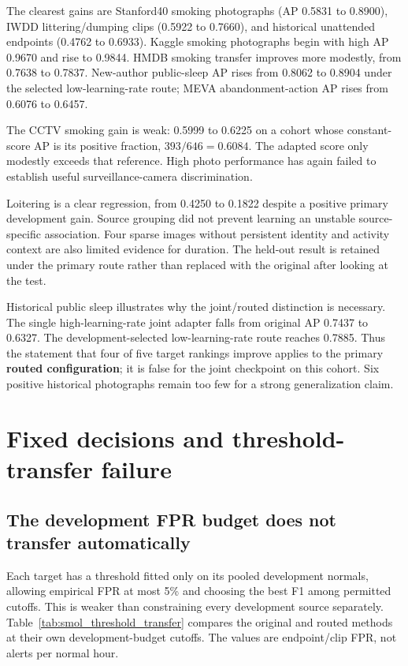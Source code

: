 The clearest gains are Stanford40 smoking photographs (AP 0.5831 to 0.8900), IWDD littering/dumping clips (0.5922 to 0.7660), and historical unattended endpoints (0.4762 to 0.6933). Kaggle smoking photographs begin with high AP 0.9670 and rise to 0.9844. HMDB smoking transfer improves more modestly, from 0.7638 to 0.7837. New-author public-sleep AP rises from 0.8062 to 0.8904 under the selected low-learning-rate route; MEVA abandonment-action AP rises from 0.6076 to 0.6457.

The CCTV smoking gain is weak: 0.5999 to 0.6225 on a cohort whose constant-score AP is its positive fraction, $393/646=0.6084$. The adapted score only modestly exceeds that reference. High photo performance has again failed to establish useful surveillance-camera discrimination.

Loitering is a clear regression, from 0.4250 to 0.1822 despite a positive primary development gain. Source grouping did not prevent learning an unstable source-specific association. Four sparse images without persistent identity and activity context are also limited evidence for duration. The held-out result is retained under the primary route rather than replaced with the original after looking at the test.

Historical public sleep illustrates why the joint/routed distinction is necessary. The single high-learning-rate joint adapter falls from original AP 0.7437 to 0.6327. The development-selected low-learning-rate route reaches 0.7885. Thus the statement that four of five target rankings improve applies to the primary \textbf{routed configuration}; it is false for the joint checkpoint on this cohort. Six positive historical photographs remain too few for a strong generalization claim.

\section{Fixed decisions and threshold-transfer failure}
\subsection{The development FPR budget does not transfer automatically}
Each target has a threshold fitted only on its pooled development normals, allowing empirical FPR at most 5\% and choosing the best F1 among permitted cutoffs. This is weaker than constraining every development source separately. Table~\ref{tab:smol_threshold_transfer} compares the original and routed methods at their own development-budget cutoffs. The values are endpoint/clip FPR, not alerts per normal hour.


